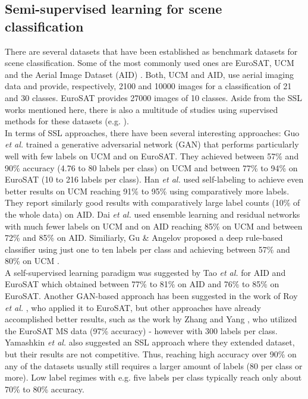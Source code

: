 \documentclass[journal]{IEEEtran}
\newcommand{\etal}{\textit{et al.}}
\begin{document}
\subsection{Semi-supervised learning for scene classification}
There are several datasets that have been established as benchmark datasets for scene classification. Some of the most commonly used ones are EuroSAT, UCM and the Aerial Image Dataset (AID) \cite{xia2017}. Both, UCM and AID, use aerial imaging data and provide, respectively, 2100 and 10000 images for a classification of 21 and 30 classes. EuroSAT provides 27000 images of 10 classes. Aside from the SSL works mentioned here, there is also a multitude of studies using supervised methods for these datasets (e.g. \cite{zhang2019,xie2019,pires2020}). \\
In terms of SSL approaches, there have been several interesting approaches: Guo \etal{} \cite{guo2020} trained a generative adversarial network (GAN) that performs particularly well with few labels on UCM and on EuroSAT. They achieved between 57\% and 90\% accuracy (4.76 to 80 labels per class) on UCM and between 77\% to 94\% on EuroSAT (10 to 216 labels per class). Han \etal{} \cite{han2018} used self-labeling to achieve even better results on UCM reaching 91\% to 95\% using comparatively more labels. They report similarly good results with comparatively large label counts (10\% of the whole data) on AID. Dai \etal{} \cite{dai2019} used ensemble learning and residual networks with much fewer labels on UCM and on AID reaching  85\% on UCM and between 72\% and 85\% on AID. Similiarly, Gu \& Angelov proposed a deep rule-based classifier using just one to ten labels per class and achieving between 57\% and 80\% on UCM \cite{gu2018semi}. \\ 
A self-supervised learning paradigm was suggested by Tao \etal{} \cite{tao2020} for AID and EuroSAT which obtained between 77\% to 81\% on AID and 76\% to 85\% on EuroSAT. Another GAN-based approach has been suggested in the work of Roy \etal{} \cite{roy2018}, who applied it to EuroSAT, but other approaches have already accomplished better results, such as the work by Zhang and Yang \cite{zhang2020}, who utilized the EuroSAT MS data (97\% accuracy) - however with 300 labels per class. Yamashkin \etal{} \cite{yamashkin2020} also suggested an SSL approach where they extended dataset, but their results are not competitive. Thus, reaching high accuracy over 90\% on any of the datasets usually still requires a larger amount of labels (80 per class or more). Low label regimes with e.g. five labels per class typically reach only about 70\% to 80\% accuracy.
\end{document}
